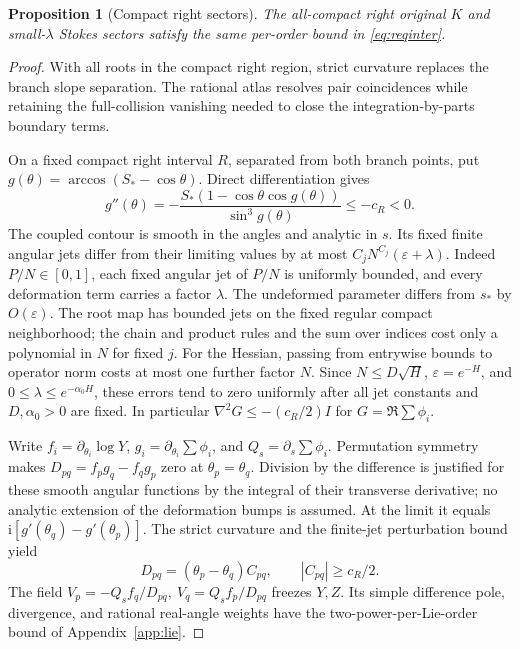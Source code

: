 \documentclass[11pt]{article}
\numberwithin{equation}{section}
\newtheorem{proposition}[theorem]{Proposition}
\theoremstyle{definition}
\newcommand{\ii}{\mathrm i}
\newcommand{\eps}{\varepsilon}
\begin{document}
\begin{proposition}[Compact right sectors]\label{prop:compactR}
The all-compact right original \(K\) and small-\(\lambda\) Stokes
sectors satisfy the same per-order bound in \eqref{eq:reqinter}.
\end{proposition}
\begin{proof}
With all roots in the compact right region, strict curvature replaces the branch slope separation. The rational atlas resolves pair coincidences while retaining the full-collision vanishing needed to close the integration-by-parts boundary terms.

On a fixed compact right interval \(R\), separated from both branch
points, put \(g(\theta)=\arccos(S_*-\cos\theta)\). Direct differentiation
gives
\[
 g''(\theta)=-\frac{S_*(1-\cos\theta\cos g(\theta))}{\sin^3g(\theta)}
            \le-c_R<0 .
\]
The coupled contour is smooth in the angles and analytic in \(s\).
Its fixed finite angular jets differ from their limiting values by at most
\(C_jN^{C_j}(\eps+\lambda)\). Indeed \(P/N\in[0,1]\), each
fixed angular jet of \(P/N\) is uniformly bounded, and every
deformation term carries a factor \(\lambda\). The undeformed
parameter differs from \(s_*\) by \(O(\eps)\). The root map has
bounded jets on the fixed regular compact neighborhood; the chain
and product rules and the sum over indices cost only a polynomial
in \(N\) for fixed \(j\). For the Hessian, passing from entrywise
bounds to operator norm costs at most one further factor \(N\).
Since \(N\le D\sqrt H\), \(\eps=e^{-H}\), and
\(0\le\lambda\le e^{-\alpha_0H}\), these errors tend to zero
uniformly after all jet constants and \(D,\alpha_0>0\) are fixed.
In particular
\(\nabla^2 G\le-(c_R/2)I\) for \(G=\Re\sum\phi_i\).

Write \(f_i=\partial_{\theta_i}\log Y\), \(g_i=\partial_{\theta_i}\sum\phi_i\),
and \(Q_s=\partial_s\sum\phi_i\). Permutation symmetry makes
\(D_{pq}=f_pg_q-f_qg_p\) zero at \(\theta_p=\theta_q\).
Division by the difference is justified for these smooth angular
functions by the integral of their transverse derivative; no analytic
extension of the deformation bumps is assumed.
At the limit it equals \(\ii[g'(\theta_q)-g'(\theta_p)]\).
The strict curvature and the finite-jet perturbation bound yield
\[
 D_{pq}=(\theta_p-\theta_q)C_{pq},\qquad |C_{pq}|\ge c_R/2 .
\]
The field
\(V_p=-Q_sf_q/D_{pq},\ V_q=Q_sf_p/D_{pq}\)
freezes \(Y,Z\). Its simple difference pole, divergence, and
rational real-angle weights have the two-power-per-Lie-order
bound of Appendix~\ref{app:lie}.


\end{proof}
\end{document}
